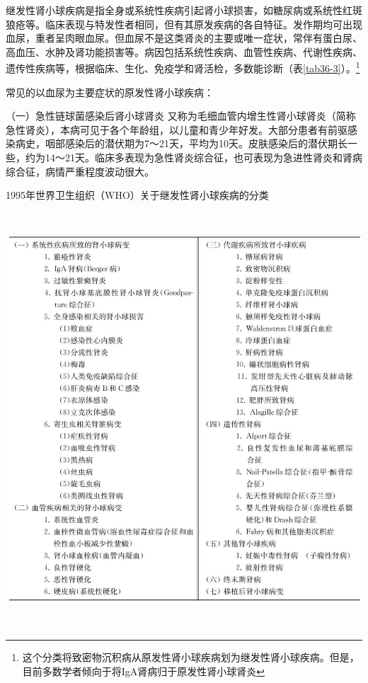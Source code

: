 继发性肾小球疾病是指全身或系统性疾病引起肾小球损害，如糖尿病或系统性红斑狼疮等。临床表现与特发性者相同，但有其原发疾病的各自特征。发作期均可出现血尿，重者呈肉眼血尿。但血尿不是这类肾炎的主要或唯一症状，常伴有蛋白尿、高血压、水肿及肾功能损害等。病因包括系统性疾病、血管性疾病、代谢性疾病、遗传性疾病等，根据临床、生化、免疫学和肾活检，多数能诊断（表\ref{tab36-3}）。\footnote{这个分类将致密物沉积病从原发性肾小球疾病划为继发性肾小球疾病。但是，目前多数学者倾向于将IgA肾病归于原发性肾小球肾炎}

常见的以血尿为主要症状的原发性肾小球疾病：

（一）急性链球菌感染后肾小球肾炎
又称为毛细血管内增生性肾小球肾炎（简称急性肾炎），本病可见于各个年龄组，以儿童和青少年好发。大部分患者有前驱感染病史，咽部感染后的潜伏期为7～21天，平均为10天。皮肤感染后的潜伏期长一些，约为14～21天。临床多表现为急性肾炎综合征，也可表现为急进性肾炎和肾病综合征，病情严重程度波动很大。

\begin{table}[htbp]
\centering
\caption{1995年世界卫生组织（WHO）关于继发性肾小球疾病的分类}
\label{tab36-3}
\includegraphics[width=5.91667in,height=6.10417in]{./images/Image00226.jpg}
\end{table}



